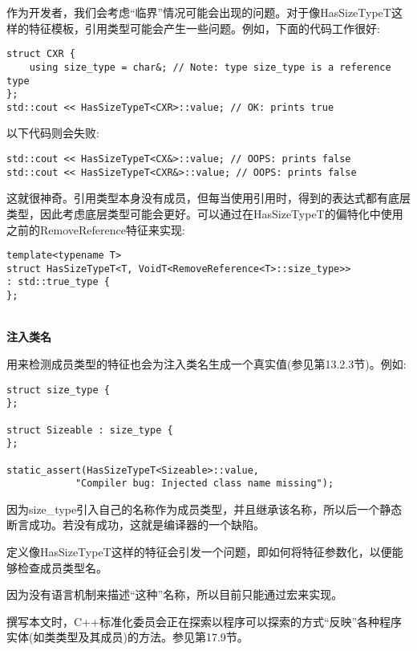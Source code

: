 作为开发者，我们会考虑“临界”情况可能会出现的问题。对于像HasSizeTypeT这样的特征模板，引用类型可能会产生一些问题。例如，下面的代码工作很好:

\begin{lstlisting}[style=styleCXX]
struct CXR {
	using size_type = char&; // Note: type size_type is a reference type
};
std::cout << HasSizeTypeT<CXR>::value; // OK: prints true
\end{lstlisting}

以下代码则会失败:

\begin{lstlisting}[style=styleCXX]
std::cout << HasSizeTypeT<CX&>::value; // OOPS: prints false
std::cout << HasSizeTypeT<CXR&>::value; // OOPS: prints false
\end{lstlisting}

这就很神奇。引用类型本身没有成员，但每当使用引用时，得到的表达式都有底层类型，因此考虑底层类型可能会更好。可以通过在HasSizeTypeT的偏特化中使用之前的RemoveReference特征来实现:

\begin{lstlisting}[style=styleCXX]
template<typename T>
struct HasSizeTypeT<T, VoidT<RemoveReference<T>::size_type>>
: std::true_type {
};
\end{lstlisting}

\hspace*{\fill} \\ %
\noindent
\textbf{注入类名}

用来检测成员类型的特征也会为注入类名生成一个真实值(参见第13.2.3节)。例如:

\begin{lstlisting}[style=styleCXX]
struct size_type {
};

struct Sizeable : size_type {
};

static_assert(HasSizeTypeT<Sizeable>::value,
			"Compiler bug: Injected class name missing");
\end{lstlisting}

因为size\_type引入自己的名称作为成员类型，并且继承该名称，所以后一个静态断言成功。若没有成功，这就是编译器的一个缺陷。


定义像HasSizeTypeT这样的特征会引发一个问题，即如何将特征参数化，以便能够检查成员类型名。

因为没有语言机制来描述“这种”名称，所以目前只能通过宏来实现。

\begin{tcolorbox}[colback=webgreen!5!white,colframe=webgreen!75!black]
\hspace*{0.75cm}撰写本文时，C++标准化委员会正在探索以程序可以探索的方式“反映”各种程序实体(如类类型及其成员)的方法。参见第17.9节。
\end{tcolorbox}

